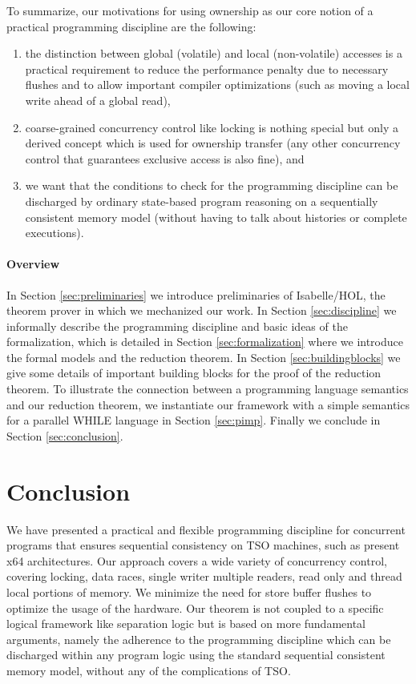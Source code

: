 \documentclass[11pt]{llncs}
\begin{document}
To summarize, our motivations for using ownership as our core notion of a 
practical programming discipline are the following:
\begin{enumerate}
\item the distinction between global (volatile) and local (non-volatile) accesses is a practical requirement to
reduce the performance penalty due to necessary flushes and to allow important compiler optimizations
(such as moving a local write ahead of a global read),
\item coarse-grained concurrency control like locking is nothing special but only a derived concept which is
used for ownership transfer (any other concurrency control that guarantees exclusive access is also fine), and
\item we want that the conditions to check for the programming discipline can be discharged by ordinary state-based 
program reasoning on a sequentially consistent memory model 
(without having to talk about histories or complete executions).
\end{enumerate} 

\paragraph{Overview}
In Section \ref{sec:preliminaries} we introduce preliminaries of
Isabelle/HOL, the theorem prover in which we mechanized our work. In
Section \ref{sec:discipline} we informally describe the programming
discipline and basic ideas of the formalization, which is detailed in
Section \ref{sec:formalization} where we introduce the formal models and the 
reduction theorem.
In Section \ref{sec:buildingblocks} we give some details of important building blocks
for the proof of the reduction theorem.
To illustrate the connection between a programming language semantics and our reduction theorem, we instantiate our 
framework with a simple semantics for a parallel WHILE language in Section \ref{sec:pimp}.
Finally we conclude in Section \ref{sec:conclusion}.


%


\section{Conclusion \label{sec:conclusion}}

We have presented a practical and flexible  programming
discipline for concurrent programs that ensures sequential consistency on TSO machines, such
as present x64 architectures. Our approach covers a wide
variety of concurrency control, covering locking, data races, single
writer multiple readers, read only and thread local portions of
memory.  We minimize the need for store buffer flushes to optimize the
usage of the hardware.  Our theorem is not coupled to a specific
logical framework like separation logic but is based on more
fundamental arguments, namely the adherence to the programming discipline
which can be discharged within any program logic using the standard sequential 
consistent memory model,  without any of the complications of TSO.
\end{document}
